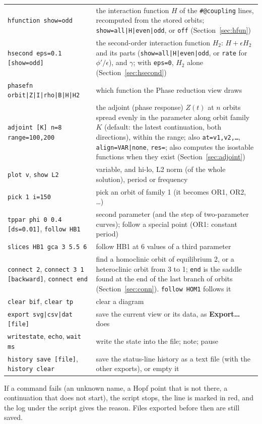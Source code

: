 \documentclass[11pt,a4paper]{article}
\newcommand{\ui}[1]{\textsf{\textbf{#1}}}          %
\begin{document}
{\begin{longtable}{@{}p{}p{}@{}}
\texttt{hfunction show=odd} & the interaction function $H$ of the \texttt{\#@coupling} lines, recomputed from the stored orbits; \texttt{show=all|H|even|odd}, or \texttt{off} (Section~\ref{sec:hfun})\\
\texttt{hsecond eps=0.1 [show=odd]} & the second-order interaction function $H_2$: $H+\epsilon H_2$ and its parts (\texttt{show=all|H|even|odd}, or \texttt{rate} for $\phi'/\epsilon$), and $\gamma$; with \texttt{eps=0}, $H_2$ alone (Section~\ref{sec:hsecond})\\
\texttt{phasefn orbit|Z|I|rho|B|H|H2} & which function the Phase reduction view draws\\
\texttt{adjoint [K] n=8 range=100,200} & the adjoint (phase response) $Z(t)$ at $n$ orbits spread evenly in the parameter along orbit family $K$ (default: the latest continuation, both directions), within the range; also \texttt{at=v1,v2,\ldots}, \texttt{align=VAR|none}, \texttt{res=}; also computes the isostable functions when they exist (Section~\ref{sec:adjoint})\\
\texttt{plot v}, \texttt{show L2} & variable, and hi-lo, L2 norm (of the whole solution), period or frequency\\
\texttt{pick 1 i=150} & pick an orbit of family 1 (it becomes OR1, OR2, \ldots)\\
\texttt{tppar phi 0 0.4 [ds=0.01]}, \texttt{follow HB1} & second parameter (and the step of two-parameter curves); follow a special point (OR1: constant period)\\
\texttt{slices HB1 gca 3 5.5 6} & follow HB1 at 6 values of a third parameter\\
\texttt{connect 2}, \texttt{connect 3 1 [backward]}, \texttt{connect end} & find a homoclinic orbit of equilibrium 2, or a heteroclinic orbit from 3 to 1; \texttt{end} is the saddle found at the end of the last branch of orbits (Section~\ref{sec:conn}). \texttt{follow HOM1} follows it\\
\texttt{clear bif}, \texttt{clear tp} & clear a diagram\\
\midrule
\texttt{export svg|csv|dat [file]} & save the current view or its data, as \ui{Export\ldots} does\\
\texttt{writestate}, \texttt{echo}, \texttt{wait ms} & write the state into the file; note; pause\\
\texttt{history save [file]}, \texttt{history clear} & save the status-line history as a text file (with the other exports), or empty it\\
\end{longtable}}
If a command fails (an unknown name, a Hopf point that is not there, a continuation that does not start), the script stops, the line is marked in red, and the log under the script gives the reason. Files exported before then are still saved.
\end{document}
